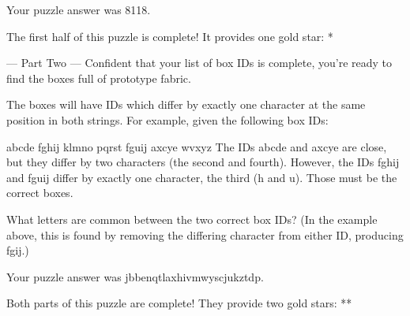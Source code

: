 Your puzzle answer was 8118.

The first half of this puzzle is complete! It provides one gold star: *

--- Part Two ---
Confident that your list of box IDs is complete, you're ready to find the boxes full of prototype fabric.

The boxes will have IDs which differ by exactly one character at the same position in both strings. For example, given the following box IDs:

abcde
fghij
klmno
pqrst
fguij
axcye
wvxyz
The IDs abcde and axcye are close, but they differ by two characters (the second and fourth). However, the IDs fghij and fguij differ by exactly one character, the third (h and u). Those must be the correct boxes.

What letters are common between the two correct box IDs? (In the example above, this is found by removing the differing character from either ID, producing fgij.)

Your puzzle answer was jbbenqtlaxhivmwyscjukztdp.

Both parts of this puzzle are complete! They provide two gold stars: **